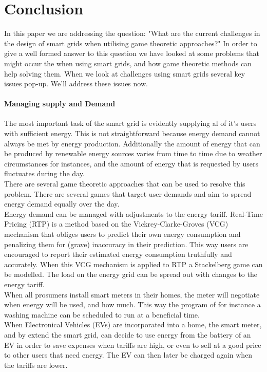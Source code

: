 \section{Conclusion}\label{conclusion}

In this paper we are addressing the question: "What are the current challenges in the design of smart grids when utilising game theoretic approaches?" In order to give a well formed answer to this question we have looked at some problems that might occur the when using smart grids, and how game theoretic methods can help solving them. When we look at challenges using smart grids several key issues pop-up. We'll address these issues now. 

\paragraph{Managing supply and Demand}
The most important task of the smart grid is evidently supplying al of it's users with sufficient energy. This is not straightforward because energy demand cannot always be met by energy production. Additionally the amount of energy that can be produced by renewable energy sources varies from time to time due to weather circumstances for instances, and the amount of energy that is requested by users fluctuates during the day. \\
There are several game theoretic approaches that can be used to resolve this problem. There are several games that target user demands and aim to spread energy demand equally over the day. \\
Energy demand can be managed with adjustments to the energy tariff. Real-Time Pricing (RTP) is a method based on the Vickrey-Clarke-Groves (VCG) mechanism that obliges users to predict their own energy consumption and penalizing them for (grave) inaccuracy in their prediction. This way users are encouraged to report their estimated energy consumption truthfully and accurately. When this VCG mechanism is applied to RTP a Stackelberg game can be modelled. The load on the energy grid can be spread out with changes to the energy tariff. \\
When all prosumers install smart meters in their homes, the meter will negotiate when energy will be used, and how much. This way the program of for instance a washing machine can be scheduled to run at a beneficial time. \\ 
When Electronical Vehicles (EVs) are incorporated into a home, the smart meter, and by extend the smart grid, can decide to use energy from the battery of an EV in order to save expenses when tariffs are high, or even to sell at a good price to other users that need energy. The EV can then later be charged again when the tariffs are lower. \\

